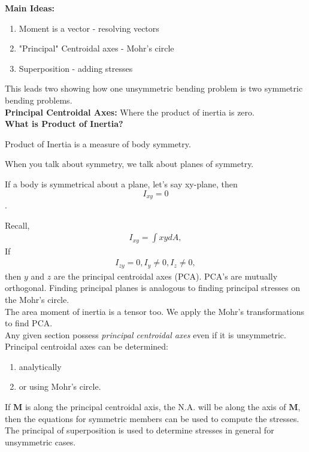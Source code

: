 \documentclass{article}
\numberwithin{equation}{subsection}
\newcommand{\bb}[1]{\mathbf{#1}}
\begin{document}
\textbf{Main Ideas:}
\begin{enumerate}
  \item Moment is a vector - resolving vectors
  \item "Principal" Centroidal axes - Mohr's circle
  \item Superposition - adding stresses
\end{enumerate}
This leads two showing how one unsymmetric bending problem is two symmetric bending problems.
\\

\textbf{Principal Centroidal Axes:}
Where the product of inertia is zero. 
\\

\textbf{What is Product of Inertia?}

Product of Inertia is a measure of body symmetry.

When you talk about symmetry, we talk about planes of symmetry.

If a body is symmetrical about a plane, let's say xy-plane, then $$ I_{xy} = 0$$.


Recall,
\begin{align*}
  I_{xy} = \int xy dA,
\end{align*}
If
\begin{align*}
  I_{zy} = 0, I_y \neq 0, I_z \neq 0,
\end{align*}
then $y$ and $z$ are the principal centroidal axes (PCA). PCA's are mutually orthogonal.
Finding principal planes is analogous to finding principal stresses on the Mohr's circle.
\\

The area moment of inertia is a tensor too. We apply the Mohr's transformations to find PCA.
\\

Any given section possess \emph{principal centroidal axes} even if it is unsymmetric.
Principal centroidal axes can be determined: 
\begin{enumerate}
  \item analytically
  \item or using Mohr's circle.
\end{enumerate}
If $\bb{M}$ is along the principal centroidal axis, the N.A. will be along the axis of $\bb{M}$,
then the equations for symmetric members can be used to compute the stresses.
The principal of superposition is used to determine stresses in general for unsymmetric cases.
\\
\end{document}
